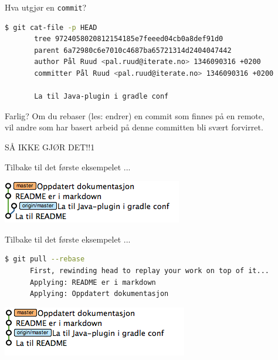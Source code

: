 \documentclass{beamer}
\begin{document}
\begin{frame}[fragile]{Hva utgjør en \texttt{commit}?}
    \begin{lstlisting}[language=bash]
       $ git cat-file -p HEAD
       tree 9724058020812154185e7feeed04cb0a8def91d0
       parent 6a72980c6e7010c4687ba65721314d2404047442
       author Pål Ruud <pal.ruud@iterate.no> 1346090316 +0200
       committer Pål Ruud <pal.ruud@iterate.no> 1346090316 +0200

       La til Java-plugin i gradle conf
    \end{lstlisting}
\end{frame}

\begin{frame}{Farlig?}
    Om du rebaser (les: endrer) en commit som finnes på en remote,\\
    vil andre som har basert arbeid på denne committen bli svært forvirret.\\
    \pause
    \bigskip
    \begin{center}
        SÅ IKKE GJØR DET!!1
    \end{center}
\end{frame}

\begin{frame}{Tilbake til det første eksempelet ...}
    \begin{center}
        \includegraphics[scale=0.7]{1.png}
    \end{center}
\end{frame}

\begin{frame}[fragile]{Tilbake til det første eksempelet ...}
    \begin{lstlisting}[language=bash]
      $ git pull --rebase
      First, rewinding head to replay your work on top of it...
      Applying: README er i markdown
      Applying: Oppdatert dokumentasjon
    \end{lstlisting}
    \medskip
    \pause
    \includegraphics[scale=0.7]{5.png}
\end{frame}
\end{document}
